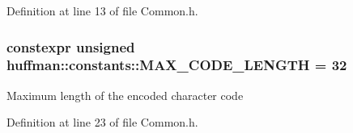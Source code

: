Definition at line 13 of file Common.\+h.

\subsubsection[{\texorpdfstring{M\+A\+X\+\_\+\+C\+O\+D\+E\+\_\+\+L\+E\+N\+G\+TH}{MAX_CODE_LENGTH}}]{\setlength{\rightskip}{0pt plus 5cm}constexpr unsigned huffman\+::constants\+::\+M\+A\+X\+\_\+\+C\+O\+D\+E\+\_\+\+L\+E\+N\+G\+TH = 32\hspace{0.3cm}{\ttfamily [static]}}\hypertarget{namespacehuffman_1_1constants_a9bbdd97bbc9095087fd624645d1082fe}{}\label{namespacehuffman_1_1constants_a9bbdd97bbc9095087fd624645d1082fe}
Maximum length of the encoded character code 

Definition at line 23 of file Common.\+h.


